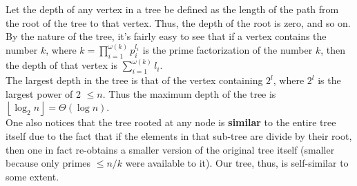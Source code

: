 \documentclass{article}
\begin{document}
Let the depth of any vertex in a tree be defined as the length of the path from the root of the tree to that vertex. Thus, the depth of the root is zero, and so on. \\
By the nature of the tree, it's fairly easy to see that if a vertex contains the number $k$, where $k = \prod_{i=1}^{\omega(k)} p_i^{l_i}$ is the prime factorization of the number $k$, then the depth of that vertex is $\sum_{i=1}^{\omega(k)} l_i$.\\
The largest depth in the tree is that of the vertex containing $2^l$, where $2^l$ is the largest power of 2 $\leq n$. Thus the maximum depth of the tree is $\left \lfloor {\log_2n}\right \rfloor = \Theta(\log n)$.\\
One also notices that the tree rooted at any node is \textbf{similar} to the entire tree itself due to the fact that if the elements in that sub-tree are divide by their root, then one in fact re-obtains a smaller version of the original tree itself (smaller because only primes $\leq n/k$ were available to it). Our tree, thus, is self-similar to some extent.
\end{document}
